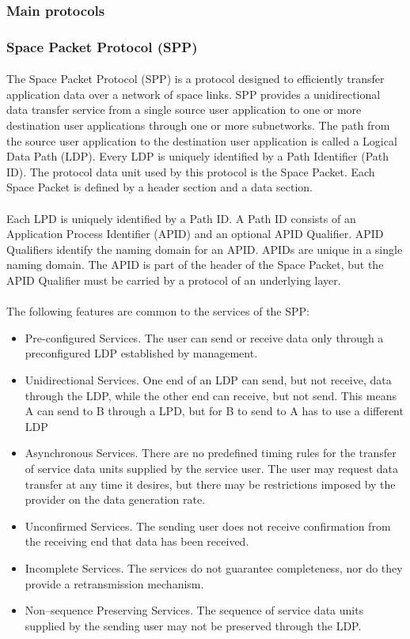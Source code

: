 \subsubsection{Main protocols}
\subsubsection*{Space Packet Protocol (SPP)\cite{SPP}}
\paragraph{}The Space Packet Protocol (SPP) is a protocol designed to efficiently transfer application data over a network of space links. SPP provides a unidirectional data transfer service from a single source user application to one or more destination user applications through one or more subnetworks. The path from the source user application to the destination user application is called a Logical Data Path (LDP). Every LDP is uniquely identified by a Path Identifier (Path ID). The protocol data unit used by this protocol is the Space Packet. Each Space Packet is defined by a header section and a data section.
\paragraph{}Each LPD is uniquely identified by a Path ID. A Path ID consists of an Application Process Identifier (APID) and an optional APID Qualifier. APID Qualifiers identify the naming domain for an APID. APIDs are unique in a single naming domain. The APID is part of the header of the Space Packet, but the APID Qualifier must be carried by a protocol of an underlying layer.
\paragraph{}The following features are common to the services of the SPP:
\begin{itemize}
\item Pre-configured Services. The user can send or receive data only through a preconfigured LDP established by management.
\item Unidirectional Services. One end of an LDP can send, but not receive, data through the LDP, while the other end can receive, but not send. This means A can send to B through a LPD, but for B to send to A has to use a different LDP
\item Asynchronous Services. There are no predefined timing rules for the transfer of service data units supplied by the service user. The user may request data transfer at any time it desires, but there may be restrictions imposed by the provider on the data generation rate.
\item Unconfirmed Services. The sending user does not receive confirmation from the receiving end that data has been received.
\item Incomplete Services. The services do not guarantee completeness, nor do they provide a retransmission mechanism.
\item Non–sequence Preserving Services. The sequence of service data units supplied by the sending user may not be preserved through the LDP.
\end{itemize}
